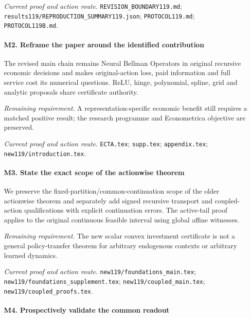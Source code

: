 \par\emph{Current proof and action route.} \nolinkurl{REVISION_BOUNDARY119.md}; \nolinkurl{results119/REPRODUCTION_SUMMARY119.json}; \nolinkurl{PROTOCOL119.md}; \nolinkurl{PROTOCOL119B.md}.

\paragraph{M2. Reframe the paper around the identified contribution}

The revised main chain remains Neural Bellman Operators in original recursive economic decisions and makes original-action loss, paid information and full service cost its numerical questions. ReLU, hinge, polynomial, spline, grid and analytic proposals share certificate authority.

\par\emph{Remaining requirement.} A representation-specific economic benefit still requires a matched positive result; the research programme and Econometrica objective are preserved.

\par\emph{Current proof and action route.} \nolinkurl{ECTA.tex}; \nolinkurl{supp.tex}; \nolinkurl{appendix.tex}; \nolinkurl{new119/introduction.tex}.

\paragraph{M3. State the exact scope of the actionwise theorem}

We preserve the fixed-partition/\allowbreak{}common-continuation scope of the older actionwise theorem and separately add signed recursive transport and coupled-action qualifications with explicit continuation errors. The active-tail proof applies to the original continuous feasible interval using global affine witnesses.

\par\emph{Remaining requirement.} The new scalar convex investment certificate is not a general policy-transfer theorem for arbitrary endogenous contexts or arbitrary learned dynamics.

\par\emph{Current proof and action route.} \nolinkurl{new119/foundations_main.tex}; \nolinkurl{new119/foundations_supplement.tex}; \nolinkurl{new119/coupled_main.tex}; \nolinkurl{new119/coupled_proofs.tex}.

\paragraph{M4. Prospectively validate the common readout}

